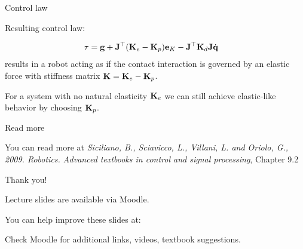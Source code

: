 \documentclass{beamer}
\begin{document}
\begin{frame}{Control law}
	\begin{flushleft}
		
		Resulting control law:
		
		\begin{align}
			\tau &= \mathbf{g} + 
			\mathbf{J}^\top  (\mathbf{K}_e  - \mathbf{K}_p) \mathbf{e}_K - 
			\mathbf{J}^\top\mathbf{K}_d \mathbf{J} \dot{\mathbf{q}}
		\end{align}
		results in a robot acting as if the contact interaction is governed by an elastic force with stiffness matrix $\mathbf{K} = \mathbf{K}_e  - \mathbf{K}_p$.
		
		\bigskip
		
		For a system with no natural elasticity $\mathbf{K}_e$ we can still achieve elastic-like behavior by choosing $\mathbf{K}_p$.
		
		
	\end{flushleft}
\end{frame}





\begin{frame}{Read more}
	\begin{flushleft}
		
		You can read more at \emph{ Siciliano, B., Sciavicco, L., Villani, L. and Oriolo, G., 2009. Robotics. Advanced textbooks in control and signal processing}, Chapter 9.2
		

\end{flushleft}
\end{frame}


\begin{frame}{Thank you!}
\centerline{Lecture slides are available via Moodle.}
\bigskip
\centerline{You can help improve these slides at:}
\centerline{\mygit}
\bigskip
\centerline{Check Moodle for additional links, videos, textbook suggestions.}
\bigskip

\centerline{\textcolor{black}{}}

\end{frame}
\end{document}

